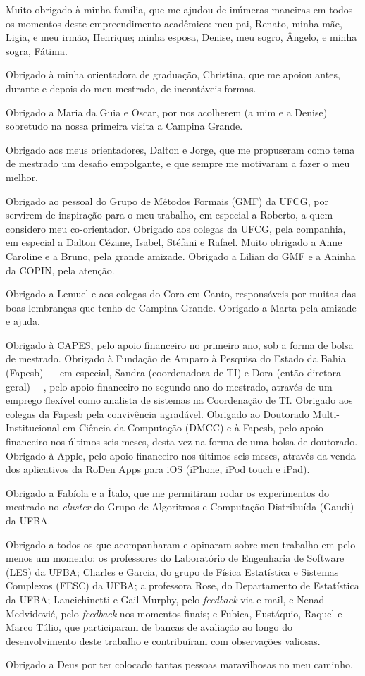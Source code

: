 Muito obrigado à minha família, que me ajudou de inúmeras maneiras em todos os momentos deste empreendimento acadêmico: meu pai, Renato, minha mãe, Ligia, e meu irmão, Henrique; minha esposa, Denise, meu sogro, Ângelo, e minha sogra, Fátima.

Obrigado à minha orientadora de graduação, Christina, que me apoiou antes, durante e depois do meu mestrado, de incontáveis formas.

Obrigado a Maria da Guia e Oscar, por nos acolherem (a mim e a Denise) sobretudo na nossa primeira visita a Campina Grande.

Obrigado aos meus orientadores, Dalton e Jorge, que me propuseram como tema de mestrado um desafio empolgante, e que sempre me motivaram a fazer o meu melhor.

Obrigado ao pessoal do Grupo de Métodos Formais (GMF) da UFCG, por servirem de inspiração para o meu trabalho, em especial a Roberto, a quem considero meu co-orientador. Obrigado aos colegas da UFCG, pela companhia, em especial a Dalton Cézane, Isabel, Stéfani e Rafael. Muito obrigado a Anne Caroline e a Bruno, pela grande amizade. Obrigado a Lilian do GMF e a Aninha da COPIN, pela atenção.

Obrigado a Lemuel e aos colegas do Coro em Canto, responsáveis por muitas das boas lembranças que tenho de Campina Grande. Obrigado a Marta pela amizade e ajuda.

Obrigado à CAPES, pelo apoio financeiro no primeiro ano, sob a forma de bolsa de mestrado. Obrigado à Fundação de Amparo à Pesquisa do Estado da Bahia (Fapesb) --- em especial, Sandra (coordenadora de TI) e Dora (então diretora geral) ---, pelo apoio financeiro no segundo ano do mestrado, através de um emprego flexível como analista de sistemas na Coordenação de TI. Obrigado aos colegas da Fapesb pela convivência agradável. Obrigado ao Doutorado Multi-Institucional em Ciência da Computação (DMCC) e à Fapesb, pelo apoio financeiro nos últimos seis meses, desta vez na forma de uma bolsa de doutorado. Obrigado à Apple, pelo apoio financeiro nos últimos seis meses, através da venda dos aplicativos da RoDen Apps para iOS (iPhone, iPod touch e iPad).

Obrigado a Fabíola e a Ítalo, que me permitiram rodar os experimentos do mestrado no \emph{cluster} do Grupo de Algoritmos e Computação Distribuída (Gaudi) da UFBA.

Obrigado a todos os que acompanharam e opinaram sobre meu trabalho em pelo menos um momento: os professores do Laboratório de Engenharia de Software (LES) da UFBA; Charles e Garcia, do grupo de Física Estatística e Sistemas Complexos (FESC) da UFBA; a professora Rose, do Departamento de Estatística da UFBA; Lancichinetti e Gail Murphy, pelo \emph{feedback} via e-mail, e Nenad Medvidović, pelo \emph{feedback} nos momentos finais; e Fubica, Eustáquio, Raquel e Marco Túlio, que participaram de bancas de avaliação ao longo do desenvolvimento deste trabalho e contribuíram com observações valiosas.

Obrigado a Deus por ter colocado tantas pessoas maravilhosas no meu caminho.